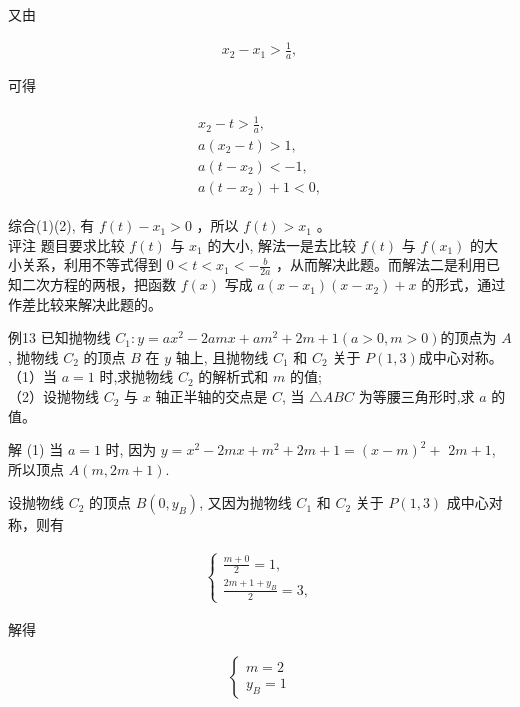 \documentclass[10pt]{article}
\begin{document}
又由

\begin{align*}
x_{2}-x_{1}>\frac{1}{a},
\end{align*}

可得

\begin{align*}
\begin{gather*}
x_{2}-t>\frac{1}{a}, \\
a\left(x_{2}-t\right)>1, \\
a\left(t-x_{2}\right)<-1, \\
a\left(t-x_{2}\right)+1<0,
\end{gather*} \tag{2}
\end{align*}

综合(1)(2), 有 $f(t)-x_{1}>0$ ，所以 $f(t)>x_{1}$ 。\\
评注 题目要求比较 $f(t)$ 与 $x_{1}$ 的大小, 解法一是去比较 $f(t)$ 与 $f\left(x_{1}\right)$ 的大小关系，利用不等式得到 $0<t<x_{1}<-\frac{b}{2 a}$ ，从而解决此题。而解法二是利用已知二次方程的两根，把函数 $f(x)$ 写成 $a\left(x-x_{1}\right)\left(x-x_{2}\right)+x$ 的形式，通过作差比较来解决此题的。

例13 已知抛物线 $C_{1}: y=a x^{2}-2 a m x+a m^{2}+2 m+1(a>0, m>0)$的顶点为 $A$, 抛物线 $C_{2}$ 的顶点 $B$ 在 $y$ 轴上, 且抛物线 $C_{1}$ 和 $C_{2}$ 关于 $P(1,3)$成中心对称。\\
（1）当 $a=1$ 时,求抛物线 $C_{2}$ 的解析式和 $m$ 的值;\\
（2）设抛物线 $C_{2}$ 与 $x$ 轴正半轴的交点是 $C$, 当 $\triangle A B C$ 为等腰三角形时,求 $a$ 的值。

解 (1) 当 $a=1$ 时, 因为 $y=x^{2}-2 m x+m^{2}+2 m+1=(x-m)^{2}+$ $2 m+1$, 所以顶点 $A(m, 2 m+1)$.

设抛物线 $C_{2}$ 的顶点 $B\left(0, y_{B}\right)$, 又因为抛物线 $C_{1}$ 和 $C_{2}$ 关于 $P(1,3)$ 成中心对称，则有

\begin{align*}
\left\{\begin{array}{l}
\frac{m+0}{2}=1, \\
\frac{2 m+1+y_{B}}{2}=3,
\end{array}\right.
\end{align*}

解得

\begin{align*}
\left\{\begin{array}{l}
m=2 \\
y_{B}=1
\end{array}\right.
\end{align*}
\end{document}

